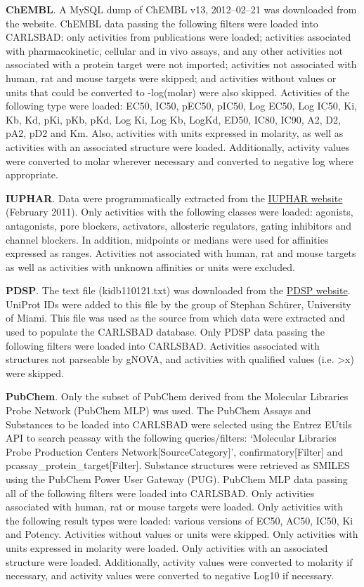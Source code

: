 \textbf{ChEMBL}. A MySQL dump of ChEMBL v13, 2012–02–21 was downloaded from the website. ChEMBL data passing the following filters were loaded into CARLSBAD: only activities from publications were loaded; activities associated with pharmacokinetic, cellular and in vivo assays, and any other activities not associated with a protein target were not imported; activities not associated with human, rat and mouse targets were skipped; and activities without values or units that could be converted to -log(molar) were also skipped. Activities of the following type were loaded: EC50, IC50, pEC50, pIC50, Log EC50, Log IC50, Ki, Kb, Kd, pKi, pKb, pKd, Log Ki, Log Kb, LogKd, ED50, IC80, IC90, A2, D2, pA2, pD2 and Km. Also, activities with units expressed in molarity, as well as activities with an associated structure were loaded. Additionally, activity values were converted to molar wherever necessary and converted to negative log where appropriate.

\textbf{IUPHAR}. Data were programmatically extracted from the \href{http://www.iuphar-db.org/}{IUPHAR website} (February 2011). Only activities with the following classes were loaded: agonists, antagonists, pore blockers, activators, allosteric regulators, gating inhibitors and channel blockers. In addition, midpoints or medians were used for affinities expressed as ranges. Activities not associated with human, rat and mouse targets as well as activities with unknown affinities or units were excluded.

\textbf{PDSP}. The text file (kidb110121.txt) was downloaded from the \href{http://pdsp.med.unc.edu/indexR.html}{PDSP website}. UniProt IDs were added to this file by the group of Stephan Sch\"{u}rer, University of Miami. This file was used as the source from which data were extracted and used to populate the CARLSBAD database. Only PDSP data passing the following filters were loaded into CARLSBAD. Activities associated with structures not parseable by gNOVA, and activities with qualified values (i.e. \textgreater x) were skipped.

\textbf{PubChem}. Only the subset of PubChem derived from the Molecular Libraries Probe Network (PubChem MLP) was used. The PubChem Assays and Substances to be loaded into CARLSBAD were selected using the Entrez EUtils API to search pcassay with the following queries/filters: ‘Molecular Libraries Probe Production Centers Network[SourceCategory]’, confirmatory[Filter] and pcassay\_protein\_target[Filter]. Substance structures were retrieved as SMILES using the PubChem Power User Gateway (PUG). PubChem MLP data passing all of the following filters were loaded into CARLSBAD. Only activities associated with human, rat or mouse targets were loaded. Only activities with the following result types were loaded: various versions of EC50, AC50, IC50, Ki and Potency. Activities without values or units were skipped. Only activities with units expressed in molarity were loaded. Only activities with an associated structure were loaded. Additionally, activity values were converted to molarity if necessary, and activity values were converted to negative Log10 if necessary.

